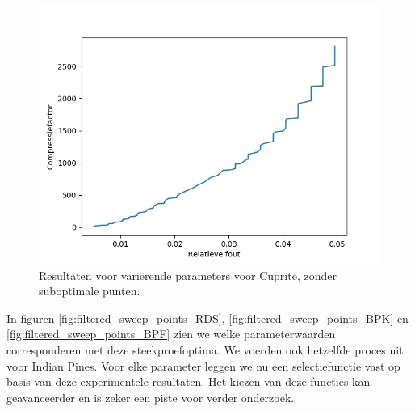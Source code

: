 \begin{figure}[H]
  \centering
  \includegraphics[scale=0.7]{images/filtered_sweep_points_cuprite.png}
  \caption{Resultaten voor vari\"erende parameters voor Cuprite, zonder suboptimale punten.}
  \label{fig:filtered_sweep_points_cuprite}
\end{figure}

In figuren \ref{fig:filtered_sweep_points_RDS}, \ref{fig:filtered_sweep_points_BPK} en \ref{fig:filtered_sweep_points_BPF} zien we welke parameterwaarden corresponderen met deze steekproefoptima. We voerden ook hetzelfde proces uit voor Indian Pines. Voor elke parameter leggen we nu een selectiefunctie vast op basis van deze experimentele resultaten. Het kiezen van deze functies kan geavanceerder en is zeker een piste voor verder onderzoek.

